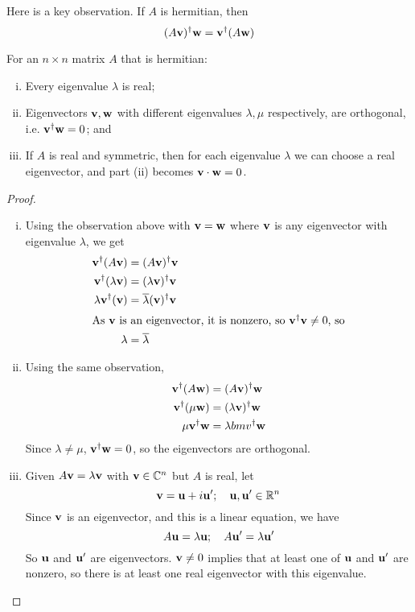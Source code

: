\documentclass{article}
\begin{document}
Here is a key observation. If $A$ is hermitian, then
\[ (A\vb v)^\dagger \vb w = \vb v^\dagger (A \vb w) \]
\begin{theorem}
	For an $n \times n$ matrix $A$ that is hermitian:
	\begin{enumerate}[(i)]
		\item Every eigenvalue $\lambda$ is real;
		\item Eigenvectors $\vb v, \vb w$ with different eigenvalues $\lambda, \mu$ respectively, are orthogonal, i.e. $\vb v^\dagger \vb w = 0$; and
		\item If $A$ is real and symmetric, then for each eigenvalue $\lambda$ we can choose a real eigenvector, and part (ii) becomes $\vb v \cdot \vb w = 0$.
	\end{enumerate}
\end{theorem}
\begin{proof}
	\begin{enumerate}[(i)]
		\item Using the observation above with $\vb v = \vb w$ where $\vb v$ is any eigenvector with eigenvalue $\lambda$, we get
		      \begin{align*}
			      \vb v^\dagger (A\vb v)        & = (A\vb v)^\dagger \vb v                   \\
			      \vb v^\dagger (\lambda\vb v)  & = (\lambda\vb v)^\dagger \vb v             \\
			      \lambda \vb v^\dagger (\vb v) & = \overline{\lambda} (\vb v)^\dagger \vb v \\
			      \intertext{As $\vb v$ is an eigenvector, it is nonzero, so $\vb v^\dagger \vb v \neq 0$, so}
			      \lambda                       & = \overline \lambda
		      \end{align*}
		\item Using the same observation,
		      \begin{align*}
			      \vb v^\dagger (A \vb w)   & = (A \vb v)^\dagger \vb w       \\
			      \vb v^\dagger (\mu \vb w) & = (\lambda \vb v)^\dagger \vb w \\
			      \mu \vb v^\dagger \vb w   & = \lambda bm v^\dagger \vb w
		      \end{align*}
		      Since $\lambda \neq \mu$, $\vb v^\dagger \vb w = 0$, so the eigenvectors are orthogonal.
		\item Given $A\vb v = \lambda \vb v$ with $\vb v \in \mathbb C^n$ but $A$ is real, let
		      \[ \vb v = \vb u + i\vb u';\quad \vb u, \vb u' \in \mathbb R^n \]
		      Since $\vb v$ is an eigenvector, and this is a linear equation, we have
		      \[ A\vb u = \lambda \vb u;\quad A\vb u' = \lambda \vb u' \]
		      So $\vb u$ and $\vb u'$ are eigenvectors. $\vb v \neq 0$ implies that at least one of $\vb u$ and $\vb u'$ are nonzero, so there is at least one real eigenvector with this eigenvalue.
	\end{enumerate}
\end{proof}
\end{document}
